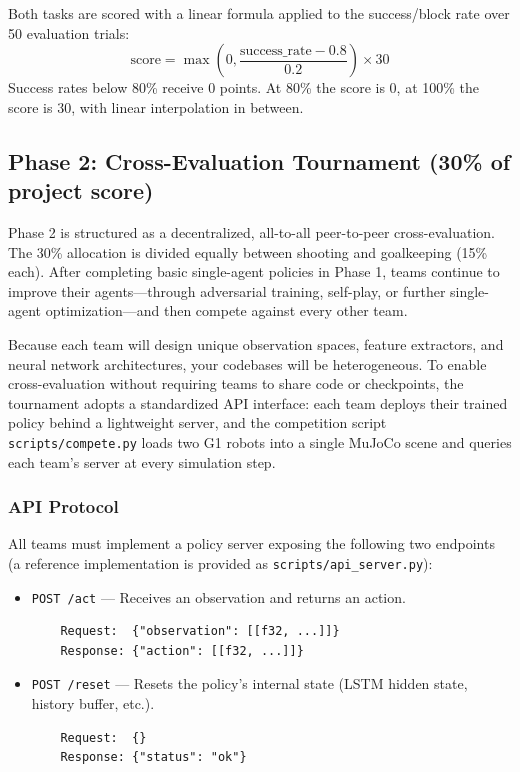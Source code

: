 \documentclass{article}
\begin{document}
Both tasks are scored with a linear formula applied to the success/block rate over 50 evaluation trials:
\[
\text{score} = \max\left(0, \frac{\text{success\_rate} - 0.8}{0.2}\right) \times 30
\]
Success rates below 80\% receive 0 points. At 80\% the score is 0, at 100\% the score is 30, with linear interpolation in between.

\subsection{Phase 2: Cross-Evaluation Tournament (30\% of project score)}

Phase 2 is structured as a decentralized, all-to-all peer-to-peer cross-evaluation. The 30\% allocation is divided equally between shooting and goalkeeping (15\% each). After completing basic single-agent policies in Phase 1, teams continue to improve their agents---through adversarial training, self-play, or further single-agent optimization---and then compete against every other team.

Because each team will design unique observation spaces, feature extractors, and neural network architectures, your codebases will be heterogeneous. To enable cross-evaluation without requiring teams to share code or checkpoints, the tournament adopts a standardized API interface: each team deploys their trained policy behind a lightweight server, and the competition script \texttt{scripts/compete.py} loads two G1 robots into a single MuJoCo scene and queries each team's server at every simulation step.

\subsubsection{API Protocol}

All teams must implement a policy server exposing the following two endpoints (a reference implementation is provided as \texttt{scripts/api\_server.py}):

\begin{itemize}
    \item \texttt{POST /act} --- Receives an observation and returns an action.
    \begin{verbatim}
    Request:  {"observation": [[f32, ...]]}
    Response: {"action": [[f32, ...]]}\end{verbatim}
    \item \texttt{POST /reset} --- Resets the policy's internal state (LSTM hidden state, history buffer, etc.).
    \begin{verbatim}
    Request:  {}
    Response: {"status": "ok"}\end{verbatim}
\end{itemize}
\end{document}

